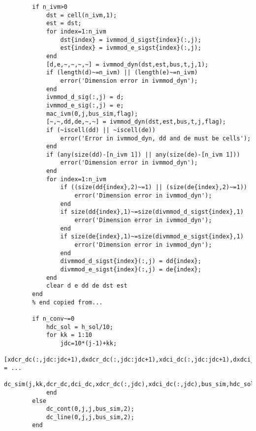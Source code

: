 \documentclass[12pt]{article}
\begin{document}
\begin{verbatim}
        if n_ivm>0
            dst = cell(n_ivm,1);
            est = dst;
            for index=1:n_ivm
                dst{index} = ivmmod_d_sigst{index}(:,j);
                est{index} = ivmmod_e_sigst{index}(:,j);
            end
            [d,e,~,~,~,~] = ivmmod_dyn(dst,est,bus,t,j,1);
            if (length(d)~=n_ivm) || (length(e)~=n_ivm)
                error('Dimension error in ivmmod_dyn'); 
            end
            ivmmod_d_sig(:,j) = d;
            ivmmod_e_sig(:,j) = e;
            mac_ivm(0,j,bus_sim,flag);
            [~,~,dd,de,~,~] = ivmmod_dyn(dst,est,bus,t,j,flag);
            if (~iscell(dd) || ~iscell(de))
                error('Error in ivmmod_dyn, dd and de must be cells'); 
            end
            if (any(size(dd)-[n_ivm 1]) || any(size(de)-[n_ivm 1]))
                error('Dimension error in ivmmod_dyn'); 
            end
            for index=1:n_ivm
                if ((size(dd{index},2)~=1) || (size(de{index},2)~=1))
                    error('Dimension error in ivmmod_dyn'); 
                end
                if size(dd{index},1)~=size(divmmod_d_sigst{index},1)
                    error('Dimension error in ivmmod_dyn'); 
                end
                if size(de{index},1)~=size(divmmod_e_sigst{index},1)
                    error('Dimension error in ivmmod_dyn'); 
                end
                divmmod_d_sigst{index}(:,j) = dd{index};
                divmmod_e_sigst{index}(:,j) = de{index};
            end
            clear d e dd de dst est
        end
        % end copied from...
        
        if n_conv~=0
            hdc_sol = h_sol/10;
            for kk = 1:10
                jdc=10*(j-1)+kk;
                [xdcr_dc(:,jdc:jdc+1),dxdcr_dc(:,jdc:jdc+1),xdci_dc(:,jdc:jdc+1),dxdci_dc(:,jdc:jdc+1)] = ...
                    dc_sim(j,kk,dcr_dc,dci_dc,xdcr_dc(:,jdc),xdci_dc(:,jdc),bus_sim,hdc_sol);
            end
        else
            dc_cont(0,j,j,bus_sim,2);
            dc_line(0,j,j,bus_sim,2);
        end
        

\end{verbatim}
\end{document}
